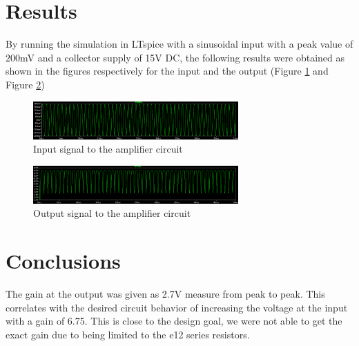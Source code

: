 \documentclass[12pt, a4paper]{article}
\begin{document}
	\section{Results} %
	\label{sub:results} 
	By running the simulation in LTspice with a sinusoidal input with a peak value of $200$mV and a collector supply of 15V DC, the following results were obtained as shown in the figures respectively for the input and the output (Figure \ref{fig:input_signal} and Figure \ref{fig:output_signal})

	\begin{figure}[H]
		\centering
		\includegraphics[width=0.7\textwidth]{Images/input_signal.png}
		\caption{Input signal to the amplifier circuit}
		\label{fig:input_signal}
	\end{figure}
	
	\begin{figure}[H]
		\centering
		\includegraphics[width=0.7\textwidth]{Images/output_signal.png}
		\caption{Output signal to the amplifier circuit}
		\label{fig:output_signal}
	\end{figure}



	\section{Conclusions} %
	The gain at the output was given as 2.7V measure from peak to peak. This correlates with the desired circuit behavior of increasing the voltage at the input with a gain of 6.75. This is close to the design goal, we were not able to get the exact gain due to being limited to the e12 series resistors.
	\label{sub:conclusions}

	
\end{document}

